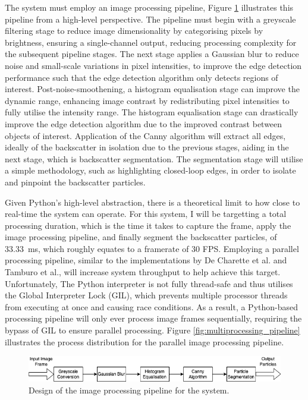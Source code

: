 The system must employ an image processing pipeline, Figure \ref{fig:processing_pipeline} illustrates this pipeline from a high-level perspective. The pipeline must begin with a greyscale filtering stage to reduce image dimensionality by categorising pixels by brightness, ensuring a single-channel output, reducing processing complexity for the subsequent pipeline stages. The next stage applies a Gaussian blur to reduce noise and small-scale variations in pixel intensities, to improve the edge detection performance such that the edge detection algorithm only detects regions of interest. Post-noise-smoothening, a histogram equalisation stage can improve the dynamic range, enhancing image contrast by redistributing pixel intensities to fully utilise the intensity range. The histogram equalisation stage can drastically improve the edge detection algorithm due to the improved contrast between objects of interest. Application of the Canny algorithm will extract all edges, ideally of the backscatter in isolation due to the previous stages, aiding in the next stage, which is backscatter segmentation. The segmentation stage will utilise a simple methodology, such as highlighting closed-loop edges, in order to isolate and pinpoint the backscatter particles.

Given Python's high-level abstraction, there is a theoretical limit to how close to real-time the system can operate. For this system, I will be targetting a total processing duration, which is the time it takes to capture the frame, apply the image processing pipeline, and finally segment the backscatter particles, of \SI{33.33}{\milli\second}, which roughly equates to a framerate of 30 FPS. Employing a parallel processing pipeline, similar to the implementations by De Charette et al. and Tamburo et al., will increase system throughput to help achieve this target. Unfortunately, The Python interpreter is not fully thread-safe and thus utilises the Global Interpreter Lock (GIL), which prevents multiple processor threads from executing at once and causing race conditions. As a result, a Python-based processing pipeline will only ever process image frames sequentially, requiring the bypass of GIL to ensure parallel processing. Figure \ref{fig:multiprocessing_pipeline} illustrates the process distribution for the parallel image processing pipeline.

\begin{figure}[H]
    \centering
    \includegraphics[width=1\textwidth]{assets/image-processing-pipeline.png}
    \caption{Design of the image processing pipeline for the system.}
    \label{fig:processing_pipeline}
\end{figure}

